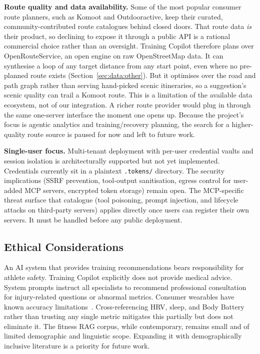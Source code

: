 \textbf{Route quality and data availability.} Some of the most popular consumer route planners, such as Komoot and Outdooractive, keep their curated, community-contributed route catalogues behind closed doors. That route data \textit{is} their product, so declining to expose it through a public API is a rational commercial choice rather than an oversight. Training Copilot therefore plans over OpenRouteService, an open engine on raw OpenStreetMap data. It can synthesise a loop of any target distance from any start point, even where no pre-planned route exists (Section~\ref{sec:data:other}). But it optimises over the road and path graph rather than serving hand-picked scenic itineraries, so a suggestion's scenic quality can trail a Komoot route. This is a limitation of the available data ecosystem, not of our integration. A richer route provider would plug in through the same one-server interface the moment one opens up. Because the project's focus is agentic analytics and training/recovery planning, the search for a higher-quality route source is paused for now and left to future work.

\textbf{Single-user focus.} Multi-tenant deployment with per-user credential vaults and session isolation is architecturally supported but not yet implemented. Credentials currently sit in a plaintext \texttt{.tokens/} directory. The security implications (SSRF prevention, tool-output sanitisation, egress control for user-added MCP servers, encrypted token storage) remain open. The MCP-specific threat surface that \cite{hou_mcp_2025} catalogue (tool poisoning, prompt injection, and lifecycle attacks on third-party servers) applies directly once users can register their own servers. It must be handled before any public deployment.

\subsection{Ethical Considerations}\label{sec:discussion:ethics}

An AI system that provides training recommendations bears responsibility for athlete safety. Training Copilot explicitly does not provide medical advice. System prompts instruct all specialists to recommend professional consultation for injury-related questions or abnormal metrics. Consumer wearables have known accuracy limitations~\citep{fuller_reliability_2020}. Cross-referencing HRV, sleep, and Body Battery rather than trusting any single metric mitigates this partially but does not eliminate it. The fitness RAG corpus, while contemporary, remains small and of limited demographic and linguistic scope. Expanding it with demographically inclusive literature is a priority for future work.

